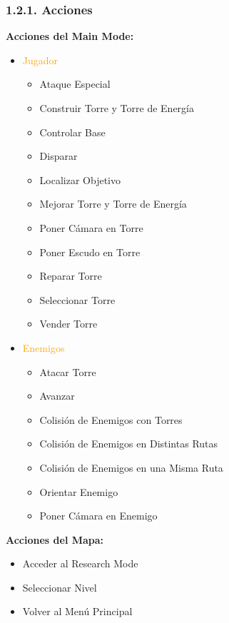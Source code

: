 \documentclass{article}
\begin{document}
\subsubsection{1.2.1. Acciones}

\noindent \textbf{Acciones del Main Mode:}

\begin{itemize}
    \item \textcolor{Orange}{Jugador}
    \begin{itemize}
        \item Ataque Especial
        \item Construir Torre y Torre de Energía
        \item Controlar Base
        \item Disparar
        \item Localizar Objetivo
        \item Mejorar Torre y Torre de Energía
        \item Poner Cámara en Torre
        \item Poner Escudo en Torre
        \item Reparar Torre
        \item Seleccionar Torre
        \item Vender Torre
    \end{itemize}
    \item \textcolor{Orange}{Enemigos}
    \begin{itemize}
        \item Atacar Torre
        \item Avanzar
        \item Colisión de Enemigos con Torres
        \item Colisión de Enemigos en Distintas Rutas
        \item Colisión de Enemigos en una Misma Ruta
        \item Orientar Enemigo
        \item Poner Cámara en Enemigo
    \end{itemize}
\end{itemize}

\hfill \break \textbf{Acciones del Mapa:}

\begin{itemize}
    \item Acceder al Research Mode
    \item Seleccionar Nivel
    \item Volver al Menú Principal
\end{itemize}
\end{document}
